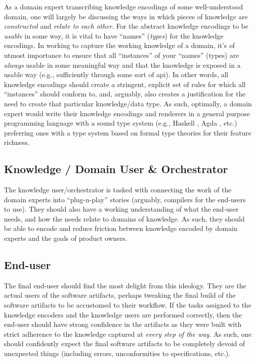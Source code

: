 As a domain expert transcribing knowledge encodings of some well-understood
domain, one will largely be discussing the ways in which pieces of knowledge are
\textit{constructed} and \textit{relate to each other}. For the abstract
knowledge encodings to be \textit{usable} in some way, it is vital to have
``names'' (\textit{types}) for the knowledge encodings. In working to capture
the working knowledge of a domain, it's of utmost importance to ensure that all
``instances'' of your ``names'' (types) are \textit{always} usable in some
meaningful way and that the knowledge is exposed in a usable way (e.g.,
sufficiently through some sort of \acs{api}). In other words, all knowledge
encodings should create a stringent, explicit set of rules for which all
``instances'' should conform to, and, arguably, also creates a justification for
the need to create that particular knowledge/data type. As such, optimally, a
domain expert would write their knowledge encodings and renderers in a general
purpose programming language with a sound type system (e.g., Haskell
\cite{Haskell2010}, Agda \cite{Norell2007}, etc.) \textemdash{} preferring ones
with a type system based on formal type theories for their feature richness.

\subsection{Knowledge / Domain User \& Orchestrator}
\label{chap:ideology:sec:a_prospective_workflow:subsec:knowledge_orchestrator}

The knowledge user/orchestrator is tasked with connecting the work of the domain
experts into ``plug-n-play'' stories (arguably, compilers for the end-users to
use). They should also have a working understanding of what the end-user needs,
and how the needs relate to domains of knowledge. As such, they should be able
to encode and reduce friction between knowledge encoded by domain experts and
the goals of product owners.

\subsection{End-user}
\label{chap:ideology:sec:a_prospective_workflow:subsec:end_user}

The final end-user should find the most delight from this ideology. They are the
actual users of the software artifacts, perhaps tweaking the final build of the
software artifacts to be accustomed to their workflow. If the tasks assigned to
the knowledge encoders and the knowledge users are performed correctly, then the
end-user should have strong confidence in the artifacts as they were built with
strict adherence to the knowledge captured at \textit{every step of the way}. As
such, one should confidently expect the final software artifacts to be
completely devoid of unexpected things (including errors, unconformities to
specifications, etc.).

